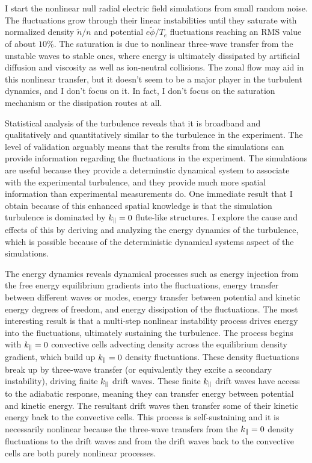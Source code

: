 I start the nonlinear null radial electric field simulations from small random noise. The fluctuations grow through their linear instabilities until they saturate with 
normalized density $\tilde{n}/n$ and potential $e \tilde{\phi}/T_e$ fluctuations reaching an RMS value of about $10 \%$. The saturation is due to nonlinear three-wave transfer from the unstable waves
to stable ones, where energy is ultimately dissipated by artificial diffusion and viscosity as well as ion-neutral collisions. 
The zonal flow may aid in this nonlinear transfer, but it doesn't seem to be a major player in the turbulent
dynamics, and I don't focus on it. In fact, I don't focus on the saturation mechanism or the dissipation routes at all.

Statistical analysis of the turbulence reveals that it is broadband and qualitatively and quantitatively similar to the turbulence in the experiment. The level of validation arguably means that
the results from the simulations can provide information regarding the fluctuations in the experiment. The simulations are useful because they provide a determinstic dynamical system to
associate with the experimental turbulence, and they provide much more spatial information than experimental measurements do. One immediate result that I obtain because of this enhanced spatial knowledge
is that the simulation turbulence is dominated by $k_\parallel = 0$ flute-like structures. I explore the cause and effects of this by deriving and analyzing the energy dynamics of the turbulence,
which is possible because of the deterministic dynamical systems aspect of the simulations.

The energy dynamics reveals dynamical processes such as energy injection from the free energy equilibrium gradients into the fluctuations, energy transfer between different waves or modes,
energy transfer between potential and kinetic energy degrees of freedom, and energy dissipation of the fluctuations. The most interesting result is that a multi-step nonlinear instability
process drives energy into the fluctuations, ultimately sustaining the turbulence. The process begins with $k_\parallel = 0$ convective cells advecting density across the equilibrium density gradient,
which build up $k_\parallel = 0$ density fluctuations. These density fluctuations break up by three-wave transfer (or equivalently they excite a secondary instability), driving finite $k_\parallel$
drift waves. These finite $k_\parallel$ drift waves have access to the adiabatic response, meaning they can transfer energy between potential and kinetic energy. The resultant drift waves then
transfer some of their kinetic energy back to the convective cells. This process is self-sustaining and it is necessarily nonlinear because the three-wave transfers from the $k_\parallel = 0$ density fluctuations
to the drift waves and from the drift waves back to the convective cells are both purely nonlinear processes. 

